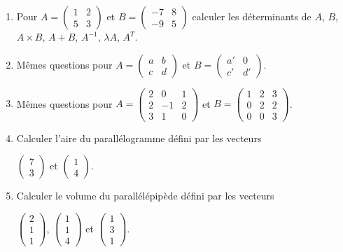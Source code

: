 \begin{frame}
\begin{miniexercice}
\begin{enumerate}
  \item Pour $A = \begin{pmatrix}1&2\\5&3\end{pmatrix}$
  et $B = \begin{pmatrix}-7&8\\-9&5\end{pmatrix}$
  calculer les déterminants de $A$, $B$, $A \times B$, $A+B$, $A^{-1}$,
  $\lambda A$, $A^T$.

  \item Mêmes questions pour $A = \begin{pmatrix}a&b\\c&d\end{pmatrix}$
  et $B = \begin{pmatrix}a'&0\\c'&d'\end{pmatrix}$.
  
  \item Mêmes questions pour 
  $A = \begin{pmatrix}2&0&1\\2&-1&2\\3&1&0\end{pmatrix}$
  et $B = \begin{pmatrix}1&2&3\\0&2&2\\0&0&3\end{pmatrix}$.
  
  \item Calculer l'aire du parallélogramme défini par les vecteurs
  
  $\left(\begin{smallmatrix}7\\3\end{smallmatrix}\right)$
  et $\left(\begin{smallmatrix}1\\4\end{smallmatrix}\right)$.
  
  \item Calculer le volume du parallélépipède défini 
  par les vecteurs 
  
  $\left(\begin{smallmatrix}2\\1\\1\end{smallmatrix}\right)$,
  $\left(\begin{smallmatrix}1\\1\\4\end{smallmatrix}\right)$ et
  $\left(\begin{smallmatrix}1\\3\\1\end{smallmatrix}\right)$.
\end{enumerate}
\end{miniexercice}
\end{frame}


